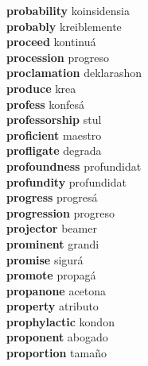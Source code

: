 \textbf{probability } koinsidensia \\
\textbf{probably } kreiblemente \\
\textbf{proceed } kontinuá \\
\textbf{procession } progreso \\
\textbf{proclamation } deklarashon \\
\textbf{produce } krea \\
\textbf{profess } konfesá \\
\textbf{professorship } stul \\
\textbf{proficient } maestro \\
\textbf{profligate } degrada \\
\textbf{profoundness } profundidat \\
\textbf{profundity } profundidat \\
\textbf{progress } progresá \\
\textbf{progression } progreso \\
\textbf{projector } beamer \\
\textbf{prominent } grandi \\
\textbf{promise } sigurá \\
\textbf{promote } propagá \\
\textbf{propanone } acetona \\
\textbf{property } atributo \\
\textbf{prophylactic } kondon \\
\textbf{proponent } abogado \\
\textbf{proportion } tamaño \\
